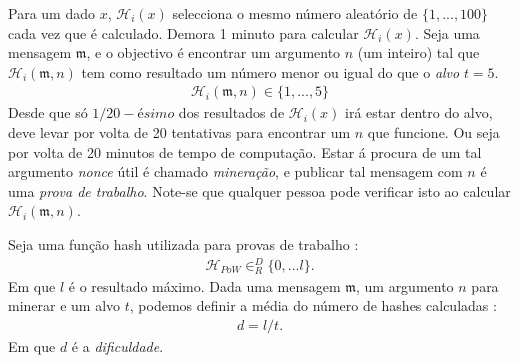 Para um dado $x$, $\mathcal{H}_i(x)$ selecciona o mesmo número aleatório de $\{1,...,100\}$ cada vez que é calculado. Demora 1 minuto para calcular $\mathcal{H}_i(x)$.
Seja uma mensagem $\mathfrak{m}$, e o objectivo é encontrar um argumento $n$ (um inteiro)
tal que $\mathcal{H}_i(\mathfrak{m},n)$ tem como resultado um número menor ou igual do que o {\em alvo} $t = 5$.
\begin{align*}
\mathcal{H}_i(\mathfrak{m},n) \in \{1,...,5\}
\end{align*}
Desde que só $1/20-ésimo$ dos resultados de $\mathcal{H}_i(x)$ irá estar dentro do alvo, deve levar por volta de 20 tentativas para encontrar um $n$ que funcione. Ou seja por volta de 20 minutos de tempo de computação.   
Estar á procura de um tal argumento {\em nonce} útil é chamado {\em mineração}, e publicar tal mensagem com $n$ é uma {\em prova de trabalho}. Note-se que qualquer pessoa pode verificar isto ao calcular $\mathcal{H}_i(\mathfrak{m},n)$. 


Seja uma função hash utilizada para provas de trabalho :
\begin{align*}
\mathcal{H}_{PoW} \in^D_R \{0,...l\} .
\end{align*}
Em que $l$ é o resultado máximo. Dada uma mensagem $\mathfrak{m}$, um argumento $n$ para minerar e um alvo $t$, podemos definir a média do número de hashes calculadas :
\begin{align*}
d = l/t .
\end{align*}
Em que $d$ é a {\em dificuldade}. 


